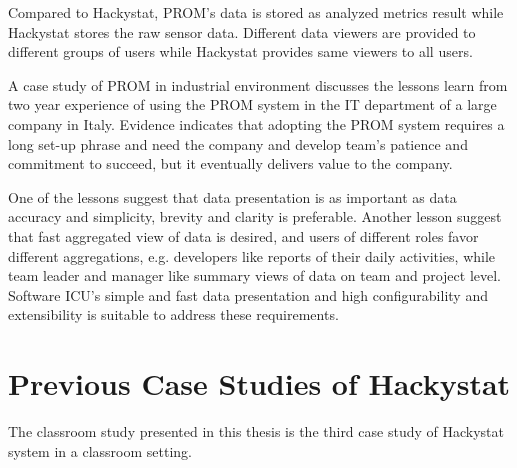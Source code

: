 Compared to Hackystat, PROM's data is stored as analyzed metrics result while Hackystat stores the raw sensor data. Different data viewers are provided to different groups of users while Hackystat provides same viewers to all users.

A case study of PROM in industrial environment\cite{prom09} discusses the lessons learn from two year experience of using the PROM system in the IT department of a large company in Italy. Evidence indicates that adopting the PROM system requires a long set-up phrase and need the company and develop team's patience and commitment to succeed, but it eventually delivers value to the company. 

One of the lessons suggest that data presentation is as important as data accuracy and simplicity, brevity and clarity is preferable. Another lesson suggest that fast aggregated view of data is desired, and users of different roles favor different aggregations, e.g. developers like reports of their daily activities, while team leader and manager like summary views of data on team and project level. Software ICU's simple and fast data presentation and high configurability and extensibility is suitable to address these requirements.



\section {Previous Case Studies of Hackystat}
The classroom study presented in this thesis is the third case study of Hackystat system in a classroom setting. 

